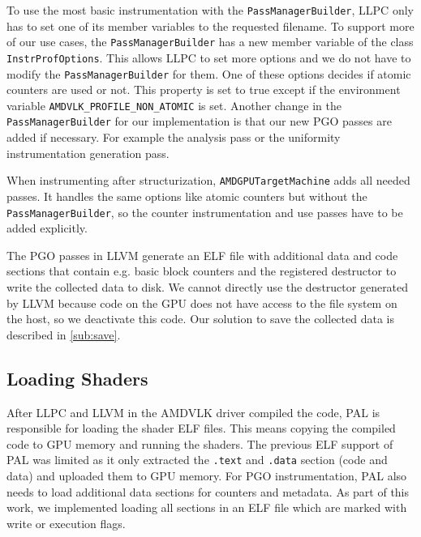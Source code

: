 To use the most basic instrumentation with the \texttt{PassManagerBuilder}, LLPC only has to set one of its member variables to the requested filename.
To support more of our use cases, the \texttt{PassManagerBuilder} has a new member variable of the class \texttt{InstrProfOptions}.
This allows LLPC to set more options and we do not have to modify the \texttt{PassManagerBuilder} for them.
One of these options decides if atomic counters are used or not.
This property is set to true except if the environment variable \texttt{AMDVLK\_PROFILE\_NON\_ATOMIC} is set.
Another change in the \texttt{PassManagerBuilder} for our implementation is that our new PGO passes are added if necessary.
For example the analysis pass or the uniformity instrumentation generation pass.

When instrumenting after structurization, \texttt{AMDGPUTargetMachine} adds all needed passes.
It handles the same options like atomic counters but without the \texttt{PassManagerBuilder}, so the counter instrumentation and use passes have to be added explicitly.

The PGO passes in LLVM generate an ELF file with additional data and code sections that contain e.g. basic block counters and the registered destructor to write the collected data to disk.
We cannot directly use the destructor generated by LLVM because code on the GPU does not have access to the file system on the host, so we deactivate this code.
Our solution to save the collected data is described in \cref{sub:save}.

\subsection{Loading Shaders}
\label{sub:loading}
After LLPC and LLVM in the AMDVLK driver compiled the code, PAL is responsible for loading the shader ELF files.
This means copying the compiled code to GPU memory and running the shaders.
The previous ELF support of PAL was limited as it only extracted the \texttt{.text} and \texttt{.data} section (code and data) and uploaded them to GPU memory.
For PGO instrumentation, PAL also needs to load additional data sections for counters and metadata.
As part of this work, we implemented loading all sections in an ELF file which are marked with write or execution flags.

